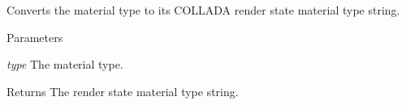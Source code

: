 \label{namespaceFUDaePassStateMaterialType_aa95b37d0687e3ed5d591c89019d2defd}
Converts the material type to its COLLADA render state material type string. 
\begin{DoxyParams}{Parameters}
\item[{\em type}]The material type. \end{DoxyParams}
\begin{DoxyReturn}{Returns}
The render state material type string. 
\end{DoxyReturn}
